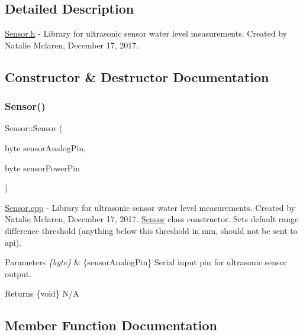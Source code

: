 \subsection{Detailed Description}
\mbox{\hyperlink{_sensor_8h}{Sensor.\+h}} -\/ Library for ultrasonic sensor water level measurements. Created by Natalie Mclaren, December 17, 2017. 

\subsection{Constructor \& Destructor Documentation}
\mbox{\label{class_sensor_a135f905806f9234a4e867a7760d6188c}} 
\subsubsection{\texorpdfstring{Sensor()}{Sensor()}}
{\footnotesize\ttfamily Sensor\+::\+Sensor (\begin{DoxyParamCaption}\item[{byte}]{sensor\+Analog\+Pin,  }\item[{byte}]{sensor\+Power\+Pin }\end{DoxyParamCaption})}

\mbox{\hyperlink{_sensor_8cpp}{Sensor.\+cpp}} -\/ Library for ultrasonic sensor water level measurements. Created by Natalie Mclaren, December 17, 2017. \mbox{\hyperlink{class_sensor}{Sensor}} class constructor. Sets default range difference threshold (anything below this threshold in mm, should not be sent to api). 
\begin{DoxyParams}{Parameters}
{\em \{byte\}} & \{sensor\+Analog\+Pin\} Serial input pin for ultrasonic sensor output. \\
\hline
\end{DoxyParams}
\begin{DoxyReturn}{Returns}
\{void\} N/A 
\end{DoxyReturn}


\subsection{Member Function Documentation}
\mbox{\label{class_sensor_ae259133b490e86863feaf97fe7b10106}} 
